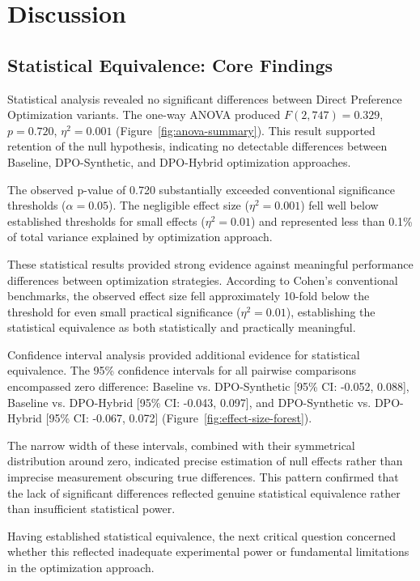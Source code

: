\chapter{Discussion}
\label{sec:discussion}

\section{Statistical Equivalence: Core Findings}
\label{sec:statistical-core}

Statistical analysis revealed no significant differences between Direct Preference Optimization variants. The one-way ANOVA produced $F(2,747) = 0.329$, $p = 0.720$, $\eta^2 = 0.001$ (Figure~\ref{fig:anova-summary}). This result supported retention of the null hypothesis, indicating no detectable differences between Baseline, DPO-Synthetic, and DPO-Hybrid optimization approaches. 

The observed p-value of 0.720 substantially exceeded conventional significance thresholds ($\alpha = 0.05$). The negligible effect size ($\eta^2 = 0.001$) fell well below established thresholds for small effects ($\eta^2 = 0.01$) and represented less than 0.1\% of total variance explained by optimization approach.

These statistical results provided strong evidence against meaningful performance differences between optimization strategies. According to Cohen's conventional benchmarks, the observed effect size fell approximately 10-fold below the threshold for even small practical significance ($\eta^2 = 0.01$), establishing the statistical equivalence as both statistically and practically meaningful.

Confidence interval analysis provided additional evidence for statistical equivalence. The 95\% confidence intervals for all pairwise comparisons encompassed zero difference: Baseline vs. DPO-Synthetic [95\% CI: -0.052, 0.088], Baseline vs. DPO-Hybrid [95\% CI: -0.043, 0.097], and DPO-Synthetic vs. DPO-Hybrid [95\% CI: -0.067, 0.072] (Figure~\ref{fig:effect-size-forest}).

The narrow width of these intervals, combined with their symmetrical distribution around zero, indicated precise estimation of null effects rather than imprecise measurement obscuring true differences. This pattern confirmed that the lack of significant differences reflected genuine statistical equivalence rather than insufficient statistical power.

Having established statistical equivalence, the next critical question concerned whether this reflected inadequate experimental power or fundamental limitations in the optimization approach.


